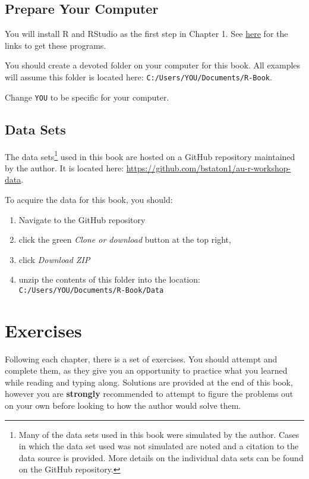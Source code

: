 \documentclass[]{book}
\providecommand{\tightlist}{%
  \setlength{\itemsep}{0pt}\setlength{\parskip}{0pt}}
\let\rmarkdownfootnote\footnote%
\def\footnote{\protect\rmarkdownfootnote}
\theoremstyle{definition}
\theoremstyle{definition}
\theoremstyle{definition}
\theoremstyle{remark}
\begin{document}
\subsection*{Prepare Your Computer}\label{comp-prep}

You will install R and RStudio as the first step in Chapter 1. See
\protect\hyperlink{install}{here} for the links to get these programs.

You should create a devoted folder on your computer for this book. All
examples will assume this folder is located here:
\texttt{C:/Users/YOU/Documents/R-Book}.

Change \texttt{YOU} to be specific for your computer.

\hypertarget{data-sets}{\subsection*{Data Sets}\label{data-sets}}

The data sets\footnote{Many of the data sets used in this book were
  simulated by the author. Cases in which the data set used was not
  simulated are noted and a citation to the data source is provided.
  More details on the individual data sets can be found on the GitHub
  repository.} used in this book are hosted on a GitHub repository
maintained by the author. It is located here:
\url{https://github.com/bstaton1/au-r-workshop-data}.

To acquire the data for this book, you should:

\begin{enumerate}
\def\labelenumi{\arabic{enumi}.}
\tightlist
\item
  Navigate to the GitHub repository
\item
  click the green \emph{Clone or download} button at the top right,
\item
  click \emph{Download ZIP}
\item
  unzip the contents of this folder into the location:
  \texttt{C:/Users/YOU/Documents/R-Book/Data}
\end{enumerate}

\section*{Exercises}\label{exercises}

Following each chapter, there is a set of exercises. You should attempt
and complete them, as they give you an opportunity to practice what you
learned while reading and typing along. Solutions are provided at the
end of this book, however you are \textbf{strongly} recommended to
attempt to figure the problems out on your own before looking to how the
author would solve them.
\end{document}
